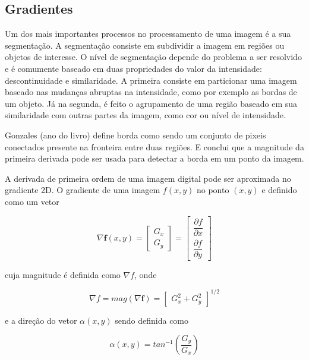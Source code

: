 \subsection{Gradientes}

Um dos mais importantes processos no processamento de uma imagem é a sua segmentação. A segmentação consiste em subdividir a imagem em regiões ou objetos de interesse. O nível de segmentação depende do problema a ser resolvido e é comumente baseado em duas propriedades do valor da intensidade: descontinuidade e similaridade. A primeira consiste em particionar uma imagem baseado nas mudanças abruptas na intensidade, como por exemplo as bordas de um objeto. Já na segunda, é feito o agrupamento de uma região baseado em sua similaridade com outras partes da imagem, como cor ou nível de intensidade.

Gonzales (ano do livro) define borda como sendo um conjunto de pixeis conectados  presente na fronteira entre duas regiões. E conclui que a magnitude da primeira derivada pode ser usada para detectar a borda em um ponto da imagem.

A derivada de primeira ordem de uma imagem digital pode ser aproximada no gradiente 2D. O gradiente de uma imagem \(f(x,y)\) no ponto \((x,y)\) e definido como um vetor

\begin{equation}
\nabla \mathbf{f}(x,y) = 
\begin{bmatrix}
G_x \\ G_y
\end{bmatrix} =
\begin{bmatrix}
\dfrac{ \partial f}{\partial x} 
\\[2ex]
\dfrac{ \partial f}{\partial y}
\end{bmatrix}
\end{equation}

cuja magnitude é definida como \(\nabla f\), onde

\begin{equation}
\nabla f = mag(\nabla \mathbf{f}) = 
\begin{bmatrix}
G_x^2 + G_y^2
\end{bmatrix}^{1/2}
\label{eq:mag}
\end{equation}

e a direção do vetor \(\alpha(x,y)\) sendo definida como

\begin{equation}
\alpha(x,y) = tan^{-1}
\left (
\dfrac{G_y}{G_x}
\right)
\end{equation}

